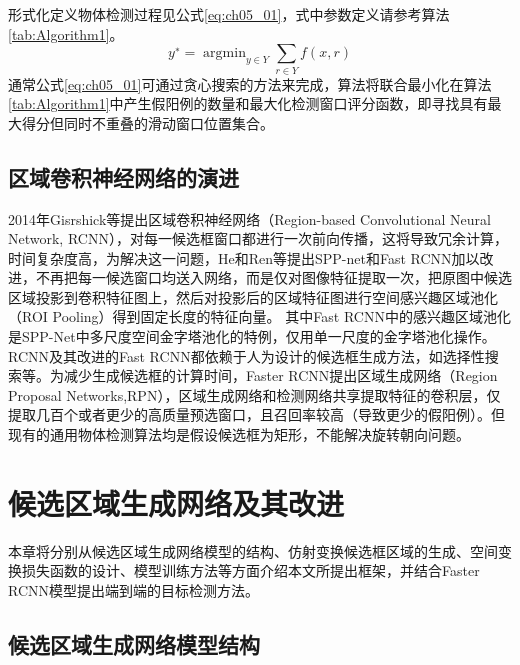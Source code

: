 形式化定义物体检测过程见公式\ref{eq:ch05_01}，式中参数定义请参考算法\ref{tab:Algorithm1}。
\begin{equation} \label{eq:ch05_01}
      y^∗=\mathop{\arg\min}_{y\in Y}\sum _{r\in Y} f(x,r)
\end{equation}                               	 
通常公式\ref{eq:ch05_01}可通过贪心搜索的方法来完成，算法将联合最小化在算法\ref{tab:Algorithm1}中产生假阳例的数量和最大化检测窗口评分函数，即寻找具有最大得分但同时不重叠的滑动窗口位置集合。
\subsection{区域卷积神经网络的演进}

2014年Gisrshick等\citep{Girshick2014b}提出区域卷积神经网络（Region-based Convolutional Neural Network, RCNN），对每一候选框窗口都进行一次前向传播，这将导致冗余计算，时间复杂度高，为解决这一问题，He和Ren等提出SPP-net\citep{He2015spp}和Fast RCNN\citep{Girshick2015b}加以改进，不再把每一候选窗口均送入网络，而是仅对图像特征提取一次，把原图中候选区域投影到卷积特征图上，然后对投影后的区域特征图进行空间感兴趣区域池化（ROI Pooling）得到固定长度的特征向量。
其中Fast RCNN中的感兴趣区域池化是SPP-Net中多尺度空间金字塔池化的特例，仅用单一尺度的金字塔池化操作。RCNN及其改进的Fast RCNN都依赖于人为设计的候选框生成方法，如选择性搜索等。为减少生成候选框的计算时间，Faster RCNN提出区域生成网络（Region Proposal Networks,RPN），区域生成网络和检测网络共享提取特征的卷积层，仅提取几百个或者更少的高质量预选窗口，且召回率较高（导致更少的假阳例）。但现有的通用物体检测算法均是假设候选框为矩形，不能解决旋转朝向问题。

 
\section{候选区域生成网络及其改进}
 
本章将分别从候选区域生成网络模型的结构、仿射变换候选框区域的生成、空间变换损失函数的设计、模型训练方法等方面介绍本文所提出框架，并结合Faster RCNN模型提出端到端的目标检测方法。

\subsection{候选区域生成网络模型结构}

